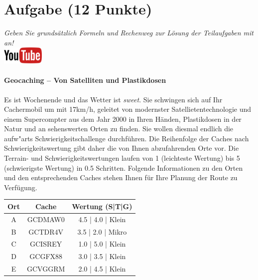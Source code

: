 \documentclass[a4paper, 10pt]{scrartcl}\usepackage[]{graphicx}\usepackage[]{xcolor}
\begin{document}
\clearpage

\section{Aufgabe \hfill (12 Punkte)}

\textit{Geben Sie grunds{\"a}tzlich Formeln und Rechenweg zur L{\"o}sung der
  Teilaufgaben mit an!} \\[1Ex]

\hfill\href{https://youtu.be/3LAq3R0rS14}{\includegraphics[width =
  2cm]{img/youtube}} %
\hspace{2Ex}

\paragraph{Geocaching -- Von Satelliten und Plastikdosen}



Es ist Wochenende und das Wetter ist \textit{sweet}. Sie schwingen sich auf
Ihr Cachermobil um mit 17km/h, geleitet von modernster
Satellietentechnologie und einem Supercompter aus dem Jahr 2000 in Ihren
H{\"a}nden, Plastikdosen in der Natur und an sehenswerten Orten zu finden. Sie
wollen diesmal endlich die aufw{"a}rts Schwierigkeitschallenge
durchf{\"u}hren. Die Reihenfolge der Caches nach Schwierigkeitswertung gibt daher
die von Ihnen abzufahrenden Orte vor. Die Terrain- und
Schwierigkeitswertungen laufen von 1 (leichteste Wertung) bis 5
(schwierigste Wertung) in 0.5 Schritten. Folgende Informationen zu den
Orten und den entsprechenden Caches stehen Ihnen f{\"u}r Ihre Planung der Route
zu Verf{\"u}gung.

\begin{center}
  \begin{tabular}{ ccc }
    \toprule
    Ort & Cache & Wertung (S|T|G) \\
    \midrule
    A & GCDMAW0 & 4.5 | 4.0 | Klein \\
    B & GCTDR4V & 3.5 | 2.0 | Mikro \\ 
    C & GCISREY & 1.0 | 5.0 | Klein \\ 
    D & GCGFX88 & 3.0 | 3.5 | Klein \\ 
    E & GCVGGRM & 2.0 | 4.5 | Klein \\     
 \bottomrule
\end{tabular}
\end{center}
\end{document}
